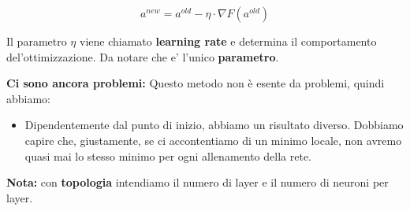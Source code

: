 \begin{equation}
    a^{new} = a^{old} - \eta \cdot \nabla F(a^{old})
\end{equation}

Il parametro $\eta$ viene chiamato \textbf{learning rate} e determina il
comportamento del'ottimizzazione. Da notare che e' l'unico \textbf{parametro}.
\begin{figure}[H]
    \begin{center}

    \end{center}

\end{figure}

\textbf{Ci sono ancora problemi:} Questo metodo non è esente da problemi, quindi abbiamo:
\begin{itemize}
    \item Dipendentemente dal punto di inizio, abbiamo un risultato diverso. Dobbiamo
          capire che, giustamente, se ci accontentiamo di un minimo locale, non avremo
          quasi mai lo stesso minimo per ogni allenamento della rete.
\end{itemize}

\textbf{Nota:} con \textbf{topologia} intendiamo il numero di layer e il numero
di neuroni per layer.

